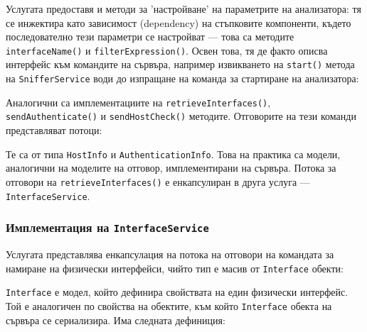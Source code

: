 \documentclass[12pt,a4paper,oneside]{book}
\begin{document}


Услугата предоставя и методи за 'настройване' на
параметрите на анализатора: тя се инжектира като зависимост (dependency) на
стъпковите компоненти, където последователно тези параметри се настройват --- това
са методите \texttt{interfaceName()} и \texttt{filterExpression()}.
Освен това, тя де факто описва интерфейс към
командите на сървъра, например извикването на \texttt{start()} метода на
\texttt{SnifferService} води до изпращане на команда за стартиране на
анализатора:



Аналогични са имплементациите на \texttt{retrieveInterfaces()}, \texttt{sendAuthenticate()} и
\texttt{sendHostCheck()} методите. Отговорите на тези команди представляват
потоци:



Те са от типа \texttt{HostInfo} и \texttt{AuthenticationInfo}. Това
на практика са модели, аналогични на моделите на отговор, имплементирани на
сървъра. Потока за отговори на \texttt{retrieveInterfaces()} е енкапсулиран в
друга услуга --- \texttt{InterfaceService}.

\subsubsection{Имплементация на \texttt{InterfaceService}}

Услугата представлява енкапсулация на потока на отговори на командата за
намиране на физически интерфейси, чийто тип е масив от \texttt{Interface}
обекти:



\texttt{Interface} е модел, който дефинира свойствата на един физически
интерфейс. Той е аналогичен по свойства на обектите, към който
\texttt{Interface} обекта на сървъра се сериализира. Има следната дефиниция:
\end{document}
